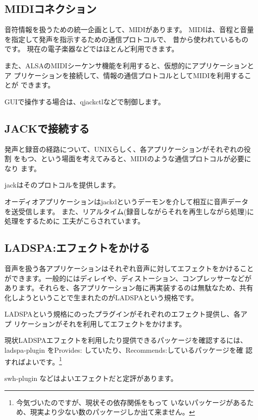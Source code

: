 \documentclass[mingoth,a4paper]{jsarticle}
\begin{document}
\subsection{MIDIコネクション}

音符情報を扱うための統一企画として、MIDIがあります。
MIDIは、音程と音量を指定して発声を指示するための通信プロトコルで、
昔から使われているものです。
現在の電子楽器などではほとんど利用できます。

また、ALSAのMIDIシーケンサ機能を利用すると、仮想的にアプリケーションとア
プリケーションを接続して、情報の通信プロトコルとしてMIDIを利用することが
できます。

GUIで操作する場合は、qjackctlなどで制御します。

\subsection{JACKで接続する}

発声と録音の経路について、UNIXらしく、各アプリケーションがそれぞれの役割
をもつ、という場面を考えてみると、MIDIのような通信プロトコルが必要になり
ます。

jackはそのプロトコルを提供します。

オーディオアプリケーションはjackdというデーモンを介して相互に音声データ
を送受信します。
また、リアルタイム(録音しながらそれを再生しながら処理)に処理をするために
工夫がこらされています。

\subsection{LADSPA:エフェクトをかける}

音声を扱う各アプリケーションはそれぞれ音声に対してエフェクトをかけること
ができます。一般的にはディレイや、ディストーション、コンプレッサーなどが
あります。それらを、各アプリケーション毎に再実装するのは無駄なため、共有
化しようということで生まれたのがLADSPAという規格です。

LADSPAという規格にのったプラグインがそれぞれのエフェクト提供し、各アプ
リケーションがそれを利用してエフェクトをかけます。

現状LADSPAエフェクトを利用したり提供できるパッケージを確認するには、
ladspa-plugin をProvides: していたり、Recommends:しているパッケージを確
認すればよいです。\footnote{今気づいたのですが、現状その依存関係をもって
いないパッケージがあるため、現実より少ない数のパッケージしか出て来ません。}

swh-plugin などはよいエフェクトだと定評があります。
\end{document}
